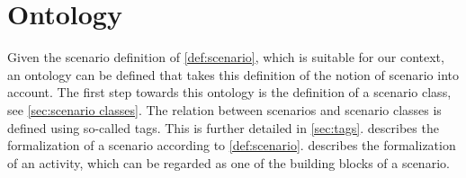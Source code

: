 \cbstart

\section{Ontology}
\label{sec:ontology}

Given the scenario definition of \cref{def:scenario}, which is suitable for our context, an ontology can be defined that takes this definition of the notion of scenario into account. The first step towards this ontology is the definition of a scenario class, see \cref{sec:scenario classes}. The relation between scenarios and scenario classes is defined using so-called tags. This is further detailed in \cref{sec:tags}.  describes the formalization of a scenario according to \cref{def:scenario}.  describes the formalization of an activity, which can be regarded as one of the building blocks of a scenario.

\cbend





